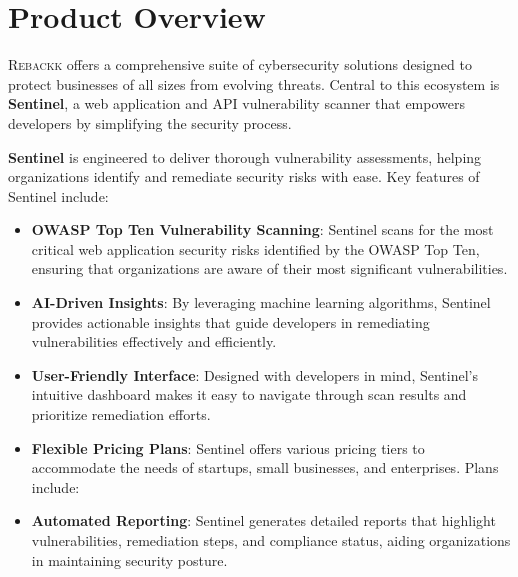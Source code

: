\chapter{Product Overview}

\lettrine{R}{ebackk} offers a comprehensive suite of cybersecurity solutions designed to protect businesses of all sizes from evolving threats. Central to this ecosystem is \textbf{Sentinel}, a web application and API vulnerability scanner that empowers developers by simplifying the security process. 

\textbf{Sentinel} is engineered to deliver thorough vulnerability assessments, helping organizations identify and remediate security risks with ease. Key features of Sentinel include:

\begin{itemize}
    \item \textbf{OWASP Top Ten Vulnerability Scanning}: Sentinel scans for the most critical web application security risks identified by the OWASP Top Ten, ensuring that organizations are aware of their most significant vulnerabilities.
    \item \textbf{AI-Driven Insights}: By leveraging machine learning algorithms, Sentinel provides actionable insights that guide developers in remediating vulnerabilities effectively and efficiently.
    \item \textbf{User-Friendly Interface}: Designed with developers in mind, Sentinel’s intuitive dashboard makes it easy to navigate through scan results and prioritize remediation efforts.
    \item \textbf{Flexible Pricing Plans}: Sentinel offers various pricing tiers to accommodate the needs of startups, small businesses, and enterprises. Plans include:
    \item \textbf{Automated Reporting}: Sentinel generates detailed reports that highlight vulnerabilities, remediation steps, and compliance status, aiding organizations in maintaining security posture.
\end{itemize}

